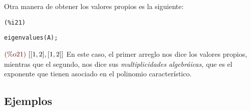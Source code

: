 \begin{solucion}

Otra manera de obtener los valores propios es la siguiente:

\noindent
\begin{minipage}{8ex}{\color{red}\bf
\begin{verbatim}
(%i21)
\end{verbatim}}
\end{minipage}
\begin{minipage}{\textwidth}{\color{blue}
\begin{verbatim}
eigenvalues(A);
\end{verbatim}}
\end{minipage}
\begin{math}\displaystyle
\parbox{8ex}{\color{labelcolor}(\%o21) }
[[1,2],[1,2]]
\end{math}
En este caso, el primer arreglo nos dice los valores propios, mientras que el segundo, nos dice sus
\emph{multiplicidades algebráicas,} que es el exponente que tienen asociado en el polinomio característico.
\end{solucion}

\subsection*{Ejemplos}


